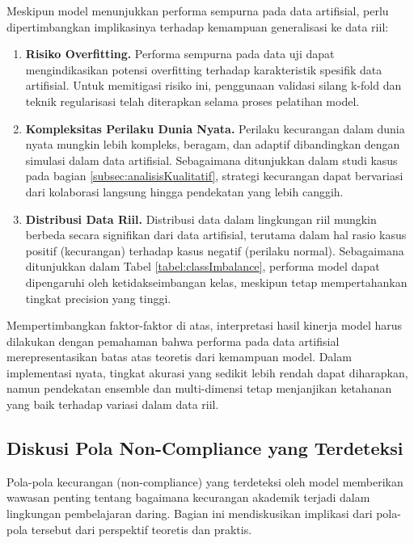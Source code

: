 Meskipun model menunjukkan performa sempurna pada data artifisial, perlu dipertimbangkan implikasinya terhadap kemampuan generalisasi ke data riil:

\begin{enumerate}
    \item \textbf{Risiko Overfitting.} Performa sempurna pada data uji dapat mengindikasikan potensi overfitting terhadap karakteristik spesifik data artifisial. Untuk memitigasi risiko ini, penggunaan validasi silang k-fold dan teknik regularisasi telah diterapkan selama proses pelatihan model.

    \item \textbf{Kompleksitas Perilaku Dunia Nyata.} Perilaku kecurangan dalam dunia nyata mungkin lebih kompleks, beragam, dan adaptif dibandingkan dengan simulasi dalam data artifisial. Sebagaimana ditunjukkan dalam studi kasus pada bagian \ref{subsec:analisisKualitatif}, strategi kecurangan dapat bervariasi dari kolaborasi langsung hingga pendekatan yang lebih canggih.

    \item \textbf{Distribusi Data Riil.} Distribusi data dalam lingkungan riil mungkin berbeda secara signifikan dari data artifisial, terutama dalam hal rasio kasus positif (kecurangan) terhadap kasus negatif (perilaku normal). Sebagaimana ditunjukkan dalam Tabel \ref{tabel:classImbalance}, performa model dapat dipengaruhi oleh ketidakseimbangan kelas, meskipun tetap mempertahankan tingkat precision yang tinggi.
\end{enumerate}

Mempertimbangkan faktor-faktor di atas, interpretasi hasil kinerja model harus dilakukan dengan pemahaman bahwa performa pada data artifisial merepresentasikan batas atas teoretis dari kemampuan model. Dalam implementasi nyata, tingkat akurasi yang sedikit lebih rendah dapat diharapkan, namun pendekatan ensemble dan multi-dimensi tetap menjanjikan ketahanan yang baik terhadap variasi dalam data riil.

\subsection{Diskusi Pola Non-Compliance yang Terdeteksi}
\label{subsec:diskusiPolaNonCompliance}

Pola-pola kecurangan (non-compliance) yang terdeteksi oleh model memberikan wawasan penting tentang bagaimana kecurangan akademik terjadi dalam lingkungan pembelajaran daring. Bagian ini mendiskusikan implikasi dari pola-pola tersebut dari perspektif teoretis dan praktis.


